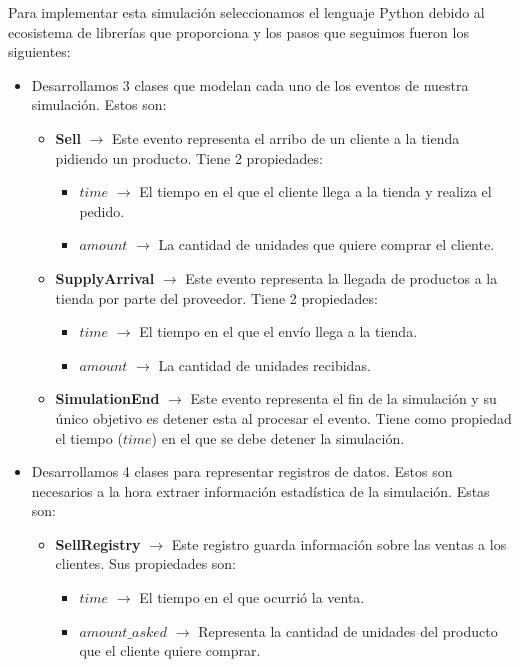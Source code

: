 \documentclass{article}
\begin{document}
Para implementar esta simulación seleccionamos el lenguaje Python debido al ecosistema de librerías que proporciona y los pasos que seguimos fueron los siguientes:
\begin{itemize}
    \item Desarrollamos 3 clases que modelan cada uno de los eventos de nuestra simulación. Estos son:
    \begin{itemize}
        \item \textbf{Sell} $\to$ Este evento representa el arribo de un cliente a la tienda pidiendo un producto. Tiene 2 propiedades:
        \begin{itemize}
            \item $time$ $\to$ El tiempo en el que el cliente llega a la tienda y realiza el pedido.
            \item $amount$ $\to$ La cantidad de unidades que quiere comprar el cliente.
        \end{itemize}
        \item \textbf{SupplyArrival} $\to$ Este evento representa la llegada de productos a la tienda por parte del proveedor. Tiene 2 propiedades:
        \begin{itemize}
            \item $time$ $\to$ El tiempo en el que el envío llega a la tienda.
            \item $amount$ $\to$ La cantidad de unidades recibidas.
        \end{itemize}
        \item \textbf{SimulationEnd} $\to$ Este evento representa el fin de la simulación y su único objetivo es detener esta al procesar el evento. Tiene como propiedad el tiempo ($time$) en el que se debe detener la simulación.
    \end{itemize}
    \item Desarrollamos 4 clases para representar registros de datos. Estos son necesarios a la hora extraer información estadística de la simulación. Estas son:
    \begin{itemize}
        \item \textbf{SellRegistry} $\to$ Este registro guarda información sobre las ventas a los clientes. Sus propiedades son:
        \begin{itemize}
            \item $time$ $\to$ El tiempo en el que ocurrió la venta.
            \item $amount\_asked$ $\to$ Representa la cantidad de unidades del producto que el cliente quiere comprar.

\end{itemize}
\end{itemize}
\end{itemize}
\end{document}
